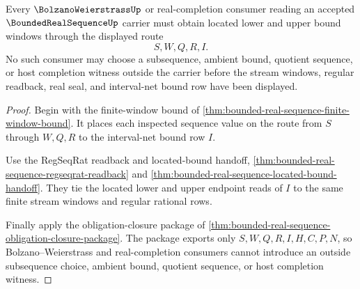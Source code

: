 \begin{theorem}
\label{thm:bounded-real-sequence-located-window-choice}
Every $\BolzanoWeierstrassUp$ or real-completion consumer reading an accepted $\BoundedRealSequenceUp$ carrier must obtain located lower and upper bound windows through the displayed route
$$
S,W,Q,R,I .
$$
No such consumer may choose a subsequence, ambient bound, quotient sequence, or host completion witness outside the carrier before the stream windows, regular readback, real seal, and interval-net bound row have been displayed.
\end{theorem}
\begin{proof}
Begin with the finite-window bound of \autoref{thm:bounded-real-sequence-finite-window-bound}. It places each inspected sequence value on the route from $S$ through $W,Q,R$ to the interval-net bound row $I$.

Use the RegSeqRat readback and located-bound handoff, \autoref{thm:bounded-real-sequence-regseqrat-readback} and \autoref{thm:bounded-real-sequence-located-bound-handoff}. They tie the located lower and upper endpoint reads of $I$ to the same finite stream windows and regular rational rows.

Finally apply the obligation-closure package of \autoref{thm:bounded-real-sequence-obligation-closure-package}. The package exports only $S,W,Q,R,I,H,C,P,N$, so Bolzano--Weierstrass and real-completion consumers cannot introduce an outside subsequence choice, ambient bound, quotient sequence, or host completion witness.
\end{proof}

